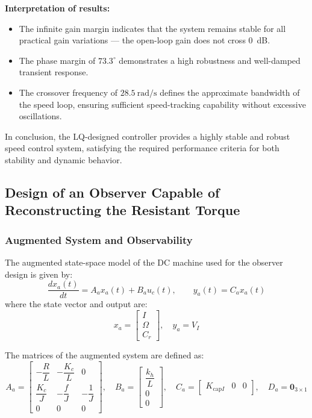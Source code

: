 \documentclass{rapportCS}
\begin{document}
\noindent\textbf{Interpretation of results:}
\begin{itemize}
    \item The infinite gain margin indicates that the system remains stable for all practical gain variations — the open-loop gain does not cross 0~dB.
    \item The phase margin of $73.3^{\circ}$ demonstrates a high robustness and well-damped transient response.
    \item The crossover frequency of $28.5~\mathrm{rad/s}$ defines the approximate bandwidth of the speed loop, ensuring sufficient speed-tracking capability without excessive oscillations.
\end{itemize}

In conclusion, the LQ-designed controller provides a highly stable and robust speed control system, satisfying the required performance criteria for both stability and dynamic behavior.

\subsection{Design of an Observer Capable of Reconstructing the Resistant Torque}
\subsubsection{Augmented System and Observability}

The augmented state-space model of the DC machine used for the observer design is given by:
\begin{equation*}
\frac{d x_a(t)}{dt} = A_a x_a(t) + B_a u_c(t), \qquad y_a(t) = C_a x_a(t)
\end{equation*}
where the state vector and output are:
\[
x_a = 
\begin{bmatrix}
I \\[4pt] \Omega \\[4pt] C_r
\end{bmatrix}, 
\quad
y_a = V_I
\]

The matrices of the augmented system are defined as:
\begin{equation*}
A_a = 
\begin{bmatrix}
-\dfrac{R}{L} & -\dfrac{K_c}{L} & 0 \\[6pt]
\dfrac{K_c}{J} & -\dfrac{f}{J} & -\dfrac{1}{J} \\[6pt]
0 & 0 & 0
\end{bmatrix},
\quad
B_a =
\begin{bmatrix}
\dfrac{k_h}{L} \\[4pt] 0 \\[4pt] 0
\end{bmatrix},
\quad
C_a = 
\begin{bmatrix}
K_{\mathrm{cap}I} & 0 & 0
\end{bmatrix},
\quad
D_a = \mathbf{0}_{3\times1}
\end{equation*}
\end{document}
